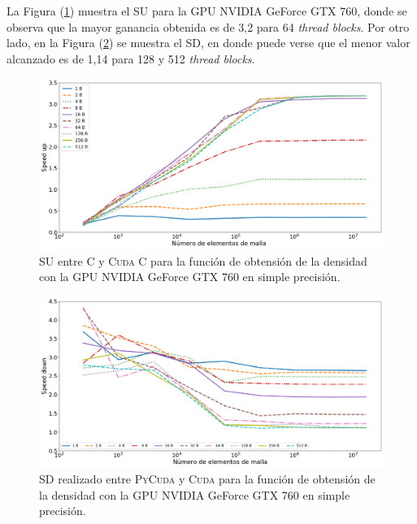 La Figura (\ref{fig:s_cuda_760_test_simple_10}) muestra el SU para la GPU NVIDIA GeForce GTX 760, donde se observa que la mayor ganancia obtenida es de 3,2 para 64 \textit{thread blocks}. Por otro lado, en la Figura (\ref{fig:s_py_760_test_simple_10}) se muestra el SD, en donde puede verse que el menor valor alcanzado es de 1,14 para 128 y 512  \textit{thread blocks}.

\begin{figure}[h!]
	\centering
	\includegraphics[width=\textwidth]{figs/cap4/s_cuda_760_test_simple_10}
	\caption{SU entre \textsc{C} y \textsc{Cuda C} para la función de obtensión de la densidad con la GPU NVIDIA GeForce GTX 760 en simple precisión.} 
	\label{fig:s_cuda_760_test_simple_10}	
\end{figure}





\begin{figure}[h!]
	\centering
	\includegraphics[width=\textwidth]{figs/cap4/s_py_760_test_simple_10}
	\caption{SD realizado entre \textsc{PyCuda} y \textsc{Cuda} para la función de obtensión de la densidad con la GPU NVIDIA GeForce GTX 760 en simple precisión.} 
	\label{fig:s_py_760_test_simple_10}	
\end{figure}


